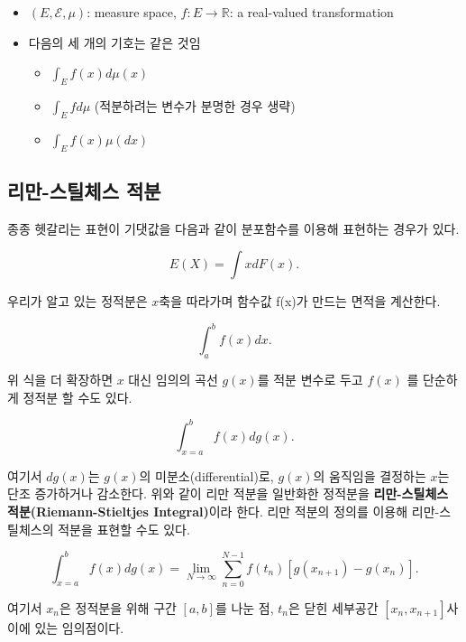 \documentclass[
  letterpaper,
  DIV=11,
  numbers=noendperiod]{scrreprt}
\providecommand{\tightlist}{%
  \setlength{\itemsep}{0pt}\setlength{\parskip}{0pt}}
\theoremstyle{definition}
\theoremstyle{plain}
\theoremstyle{plain}
\theoremstyle{definition}
\theoremstyle{plain}
\theoremstyle{definition}
\theoremstyle{remark}
\begin{document}
\begin{itemize}
\item
  \((E,\mathcal{E},\mu)\): measure space,
  \(f: E \rightarrow\mathbb{R}\): a real-valued transformation
\item
  다음의 세 개의 기호는 같은 것임

  \begin{itemize}
  \tightlist
  \item
    \(\int_E f(x) d\mu (x)\)
  \item
    \(\int_E f d\mu\) (적분하려는 변수가 분명한 경우 생략)
  \item
    \(\int_E f(x) \mu (dx)\)
  \end{itemize}
\end{itemize}

\subsection{리만-스틸체스
적분}\label{uxb9acuxb9cc-uxc2a4uxd2f8uxccb4uxc2a4-uxc801uxbd84}

종종 헷갈리는 표현이 기댓값을 다음과 같이 분포함수를 이용해 표현하는
경우가 있다.

\[
E(X) = \int x dF(x).
\]

우리가 알고 있는 정적분은 \(x\)축을 따라가며 함수값 f(x)가 만드는 면적을
계산한다.

\[
\int_a^b f(x) dx.
\]

위 식을 더 확장하면 \(x\) 대신 임의의 곡선 \(g(x)\)를 적분 변수로 두고
\(f(x)\) 를 단순하게 정적분 할 수도 있다.

\[
\int_{x=a}^b f(x) dg(x).
\]

여기서 \(dg(x)\)는 \(g(x)\)의 미분소(differential)로, \(g(x)\)의
움직임을 결정하는 \(x\)는 단조 증가하거나 감소한다. 위와 같이 리만
적분을 일반화한 정적분을 \textbf{리만-스틸체스 적분(Riemann-Stieltjes
Integral)}이라 한다. 리만 적분의 정의를 이용해 리만-스틸체스의 적분을
표현할 수도 있다.

\[
\int_{x=a}^b f(x) dg(x) = \lim_{N\rightarrow \infty} \sum_{n=0}^{N-1} f(t_n) [g(x_{n+1}) - g(x_n)].
\]

여기서 \(x_n\)은 정적분을 위해 구간 \([a,b]\)를 나눈 점, \(t_n\)은 닫힌
세부공간 \([x_n, x_{n+1} ]\)사이에 있는 임의점이다.
\end{document}
